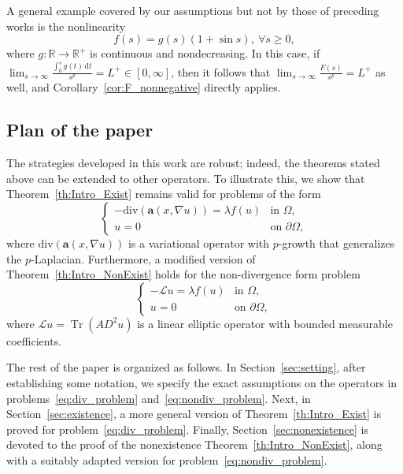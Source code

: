 \documentclass[10pt,twoside,english,reqno,a4paper]{amsart}
\theoremstyle{plain}
\theoremstyle{plain}
\theoremstyle{definition}
\theoremstyle{remark}
\numberwithin{equation}{section}
\newcommand{\R}{\mathbb{R}}
\def\div{\mathrm{div}}
\newcommand{\oL}{L^+}
\begin{document}
A general example covered by our assumptions but not by those of preceding works is the nonlinearity 
\[
f(s)=g(s)(1+\sin s),\ \forall s\geq 0,
\]
where $g\colon \R\to \R^+$ is continuous and nondecreasing. In this case, if $\lim_{s\to \infty} \frac{\int_0^s g(t)\, \mathrm{d}t}{s^p} = \oL \in [0,\infty]$, then it follows that $\lim_{s\to \infty} \frac{F(s)}{s^p} = \oL$ as well, and Corollary~\ref{cor:F_nonnegative} directly applies.



\subsection{Plan of the paper}

The strategies developed in this work are robust; indeed, the theorems stated above can be extended to other operators. To illustrate this, we show that Theorem~\ref{th:Intro_Exist} remains valid for problems of the form
\begin{equation}
	\label{eq:div_problem}
	\begin{cases}
		-\div(\mathbf{a}(x,\nabla u)) = \lambda f(u) & \text{in } \Omega,\\
		u=0 & \text{on } \partial\Omega,
	\end{cases}
\end{equation}
where $\div(\mathbf{a}(x,\nabla u))$ is a variational operator with $p$-growth that generalizes the $p$-Laplacian. Furthermore, a modified version of Theorem~\ref{th:Intro_NonExist} holds for the non-divergence form problem
\begin{equation}
    \label{eq:nondiv_problem}
    \begin{cases}
    -\mathcal{L}u = \lambda f(u) & \text{in } \Omega, \\
    u = 0 & \text{on } \partial\Omega,
    \end{cases}
\end{equation}
where $\mathcal{L}u= \operatorname{Tr}(AD^2u)$ is a linear elliptic operator with bounded measurable coefficients.

The rest of the paper is organized as follows. In Section~\ref{sec:setting}, after establishing some notation, we specify the exact assumptions on the operators in problems~\eqref{eq:div_problem} and~\eqref{eq:nondiv_problem}. Next, in Section~\ref{sec:existence}, a more general version of Theorem~\ref{th:Intro_Exist} is proved for problem~\eqref{eq:div_problem}. Finally, Section~\ref{sec:nonexistence} is devoted to the proof of the nonexistence Theorem~\ref{th:Intro_NonExist}, along with a suitably adapted version for problem~\eqref{eq:nondiv_problem}.
\end{document}
